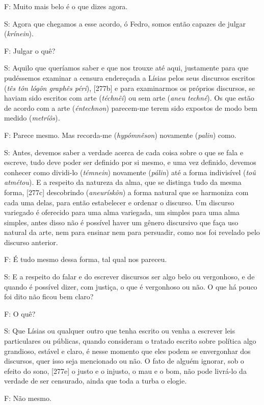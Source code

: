 F: Muito mais belo é o que dizes agora.

S: Agora que chegamos a esse acordo, ó Fedro, somos então capazes de
julgar (\emph{krínein}).

F: Julgar o quê?

S: Aquilo que queríamos saber e que nos trouxe até aqui, justamente para
que pudéssemos examinar a censura endereçada a Lísias pelos seus
discursos escritos (\emph{tês tôn lógôn graphês péri}), {[}277b{]} e
para examinarmos os próprios discursos, se haviam sido escritos com arte
(\emph{téchnêi}) ou sem arte (\emph{aneu techné}). Os que estão de
acordo com a arte (\emph{éntechnon}) parecem-me terem sido expostos de
modo bem medido (\emph{metríôs})\emph{.}

F: Parece mesmo. Mas recorda-me (\emph{hypómnêson}) novamente
(\emph{palin}) como.

S: Antes, devemos saber a verdade acerca de cada coisa sobre o que se
fala e escreve, tudo deve poder ser definido por si mesmo, e uma vez
definido, devemos conhecer como dividi-lo (\emph{témnein}) novamente
(\emph{pálin}) até a forma indivisível (\emph{toû atmétou}). E a
respeito da natureza da alma, que se distinga tudo da mesma forma,
{[}277c{]} descobrindo (\emph{aneurískôn}) a forma natural que se
harmoniza com cada uma delas, para então estabelecer e ordenar o
discurso. Um discurso variegado é oferecido para uma alma variegada, um
simples para uma alma simples, antes disso não é possível haver um
gênero discursivo que faça uso natural da arte, nem para ensinar nem
para persuadir, como nos foi revelado pelo discurso anterior.

F: É tudo mesmo dessa forma, tal qual nos pareceu.

S: E a respeito do falar e do escrever discursos ser algo belo ou
vergonhoso, e de quando é possível dizer, com justiça, o que é
vergonhoso ou não. O que há pouco foi dito não ficou bem claro?

F: O quê?

S: Que Lísias ou qualquer outro que tenha escrito ou venha a escrever
leis particulares ou públicas, quando consideram o tratado escrito sobre
política algo grandioso, estável e claro, é nesse momento que eles podem
se envergonhar dos discursos, quer isso seja mencionado ou não. O fato
de alguém ignorar, sob o efeito do sono, {[}277e{]} o justo e o injusto,
o mau e o bom, não pode livrá-lo da verdade de ser censurado, ainda que
toda a turba o elogie.

F: Não mesmo.

